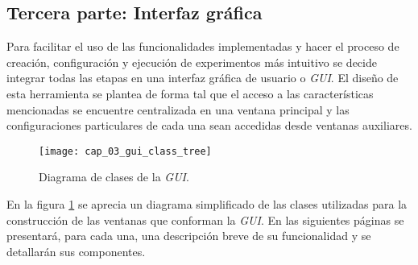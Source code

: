 \documentclass[\main/Main.tex]{subfiles}
\begin{document}
		\subsection{Tercera parte: Interfaz gráfica}
		\label{sub:03_gui}
			Para facilitar el uso de las funcionalidades implementadas y hacer el proceso de creación, configuración y ejecución de experimentos más intuitivo se decide integrar todas las etapas en una interfaz gráfica de usuario o \textit{GUI}. El diseño de esta herramienta se plantea de forma tal que el acceso a las características mencionadas se encuentre centralizada en una ventana principal y las configuraciones particulares de cada una sean accedidas desde ventanas auxiliares. 
			\begin{figure}[H]
				\centering
				\texttt{[image: cap\_03\_gui\_class\_tree]}
				\caption{Diagrama de clases de la \textit{GUI}.}
				\label{fig:03_gui_class_tree}
			\end{figure} 

			En la figura \ref{fig:03_gui_class_tree} se aprecia un diagrama simplificado de las clases utilizadas para la construcción de las ventanas que conforman la \textit{GUI}. En las siguientes páginas se presentará, para cada una, una descripción breve de su funcionalidad y se detallarán sus componentes.
\end{document}
